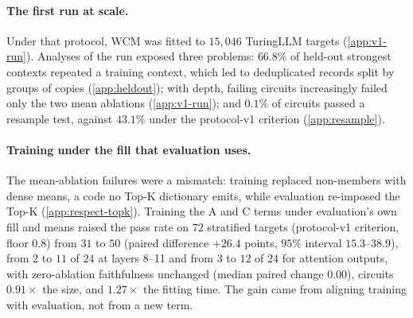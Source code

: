 \paragraph{The first run at scale.}
Under that protocol, WCM was fitted to $15{,}046$ TuringLLM targets (\cref{app:v1-run}).
Analyses of the run exposed three problems: $66.8\%$ of held-out strongest contexts repeated a training context, which led to deduplicated records split by groups of copies (\cref{app:heldout}); with depth, failing circuits increasingly failed only the two mean ablations (\cref{app:v1-run}); and $0.1\%$ of circuits passed a resample test, against $43.1\%$ under the protocol-v1 criterion (\cref{app:resample}).

\paragraph{Training under the fill that evaluation uses.}
The mean-ablation failures were a mismatch: training replaced non-members with dense means, a code no Top-K dictionary emits, while evaluation re-imposed the Top-K (\cref{app:respect-topk}).
Training the A and C terms under evaluation's own fill and means raised the pass rate on $72$ stratified targets (protocol-v1 criterion, floor $0.8$) from $31$ to $50$ (paired difference $+26.4$ points, $95\%$ interval $15.3$--$38.9$), from $2$ to $11$ of $24$ at layers 8--11 and from $3$ to $12$ of $24$ for attention outputs, with zero-ablation faithfulness unchanged (median paired change $0.00$), circuits $0.91\times$ the size, and $1.27\times$ the fitting time.
The gain came from aligning training with evaluation, not from a new term.

